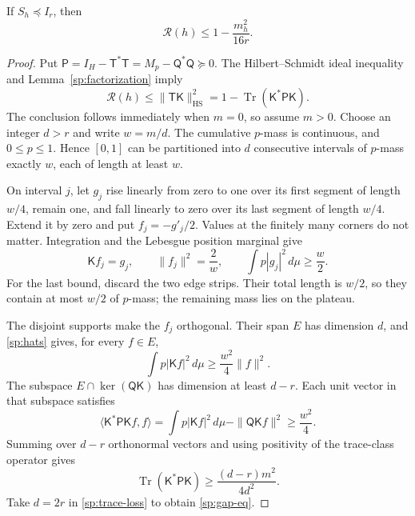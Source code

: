 \begin{lemma}\label{sp:gap}
If \(S_h\preceq I_r\), then
\begin{equation}\label{sp:gap-eq}
 \mathcal R(h)\le1-\frac{m_h^2}{16r}.
\end{equation}
\end{lemma}
\begin{proof}
Put
\(\mathsf P=I_H-\mathsf T^*\mathsf T=M_p-\mathsf Q^*\mathsf Q\succeq0\).
The Hilbert--Schmidt ideal inequality and
Lemma~\ref{sp:factorization} imply
\begin{equation}\label{sp:trace-loss}
 \mathcal R(h)
 \le\|\mathsf T\mathsf K\|_{\mathrm{HS}}^2
 =1-\operatorname{Tr}(\mathsf K^*\mathsf P\mathsf K).
\end{equation}
The conclusion follows immediately when \(m=0\), so assume \(m>0\).
Choose an integer \(d>r\) and write \(w=m/d\). The cumulative
\(p\)-mass is continuous, and \(0\le p\le1\). Hence \([0,1]\)
can be partitioned into \(d\) consecutive intervals of \(p\)-mass
exactly \(w\), each of length at least \(w\).

On interval \(j\), let \(g_j\) rise linearly from zero to one over
its first segment of length \(w/4\), remain one, and fall linearly to
zero over its last segment of length \(w/4\). Extend it by zero and
put \(f_j=-g'_j/2\). Values at the finitely many corners do not matter.
Integration and the Lebesgue position marginal give
\begin{equation}\label{sp:hats}
 \mathsf Kf_j=g_j,\qquad
 \|f_j\|^2=\frac2w,\qquad
 \int p|g_j|^2\,d\mu\ge\frac w2.
\end{equation}
For the last bound, discard the two edge strips. Their total length
is \(w/2\), so they contain at most \(w/2\) of \(p\)-mass; the
remaining mass lies on the plateau.

The disjoint supports make the \(f_j\) orthogonal. Their span \(E\)
has dimension \(d\), and \eqref{sp:hats} gives, for every \(f\in E\),
\[
 \int p|\mathsf Kf|^2\,d\mu\ge\frac{w^2}{4}\|f\|^2.
\]
The subspace \(E\cap\ker(\mathsf Q\mathsf K)\) has dimension at
least \(d-r\). Each unit vector in that subspace satisfies
\[
 \langle\mathsf K^*\mathsf P\mathsf Kf,f\rangle
 =\int p|\mathsf Kf|^2\,d\mu-\|\mathsf Q\mathsf Kf\|^2
 \ge\frac{w^2}{4}.
\]
Summing over \(d-r\) orthonormal vectors and using positivity of the
trace-class operator gives
\[
 \operatorname{Tr}(\mathsf K^*\mathsf P\mathsf K)
 \ge\frac{(d-r)m^2}{4d^2}.
\]
Take \(d=2r\) in \eqref{sp:trace-loss} to obtain
\eqref{sp:gap-eq}.
\end{proof}

